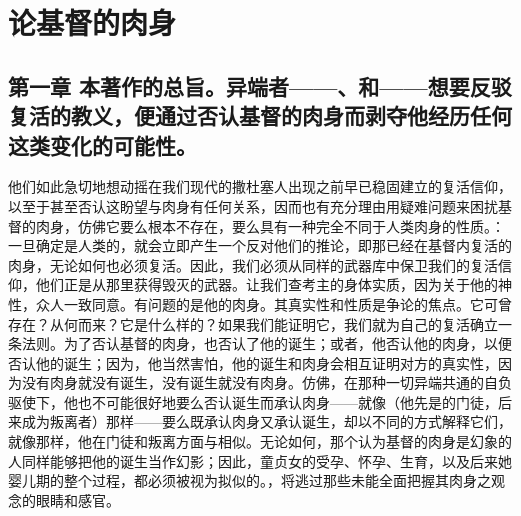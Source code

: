 
\chapter{论基督的肉身}


\par


\section{第一章 本著作的总旨。异端者——、和——想要反驳复活的教义，便通过否认基督的肉身而剥夺他经历任何这类变化的可能性。}

他们如此急切地想动摇在我们现代的撒杜塞人出现之前早已稳固建立的复活信仰，以至于甚至否认这盼望与肉身有任何关系，因而也有充分理由用疑难问题来困扰基督的肉身，仿佛它要么根本不存在，要么具有一种完全不同于人类肉身的性质。：一旦确定是人类的，就会立即产生一个反对他们的推论，即那已经在基督内复活的肉身，无论如何也必须复活。因此，我们必须从同样的武器库中保卫我们的复活信仰，他们正是从那里获得毁灭的武器。让我们查考主的身体实质，因为关于他的神性，众人一致同意。有问题的是他的肉身。其真实性和性质是争论的焦点。它可曾存在？从何而来？它是什么样的？如果我们能证明它，我们就为自己的复活确立一条法则。为了否认基督的肉身，也否认了他的诞生；或者，他否认他的肉身，以便否认他的诞生；因为，他当然害怕，他的诞生和肉身会相互证明对方的真实性，因为没有肉身就没有诞生，没有诞生就没有肉身。仿佛，在那种一切异端共通的自负驱使下，他也不可能很好地要么否认诞生而承认肉身——就像（他先是的门徒，后来成为叛离者）那样——要么既承认肉身又承认诞生，却以不同的方式解释它们，就像那样，他在门徒和叛离方面与相似。无论如何，那个认为基督的肉身是幻象的人同样能够把他的诞生当作幻影；因此，童贞女的受孕、怀孕、生育，以及后来她婴儿期的整个过程，都必须被视为拟似的。，将逃过那些未能全面把握其肉身之观念的眼睛和感官。\par

